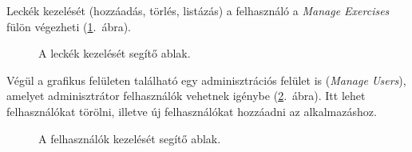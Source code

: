\documentclass[11pt, a4paper]{article}
\begin{document}
     Leckék kezelését (hozzáadás, törlés, listázás) a felhasználó a \emph{Manage Exercises} fülön végezheti (\ref{fig:manage-exercises}.~ábra).
     \begin{figure}[h!]
     	\center
     	\caption{A leckék kezelését segítő ablak.}
     	\label{fig:manage-exercises}
     \end{figure}
     Végül a grafikus felületen található egy adminisztrációs felület is (\emph{Manage Users}), amelyet adminisztrátor felhasználók vehetnek igénybe (\ref{fig:manage-users}.~ábra). Itt lehet felhasználókat törölni, illetve új felhasználókat hozzáadni az alkalmazáshoz.    
     \begin{figure}[h!]
     	\center
     	\caption{A felhasználók kezelését segítő ablak.}
     	\label{fig:manage-users}
     \end{figure}
 
\end{document}
